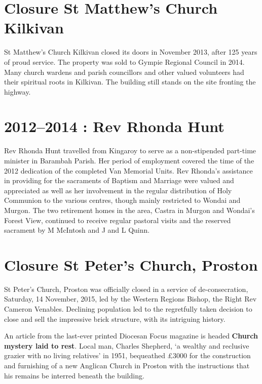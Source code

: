 \section{Closure St Matthew's Church Kilkivan}



St Matthew's Church Kilkivan closed its doors in November 2013, after 125 years of proud service. The property was sold to Gympie Regional Council in 2014. Many church wardens and parish councillors and other valued volunteers had their spiritual roots in Kilkivan. The building still stands on the site fronting the highway.



\section{2012--2014 : Rev Rhonda Hunt}



Rev Rhonda Hunt travelled from Kingaroy to serve as a non-stipended part-time minister in Barambah Parish. Her period of employment covered the time of the 2012 dedication of the completed Van Memorial Units. Rev Rhonda's assistance in providing for the sacraments of Baptism and Marriage were valued and appreciated as well as her involvement in the regular distribution of Holy Communion to the various centres, though mainly restricted to Wondai and Murgon. The two retirement homes in the area, Castra in Murgon and Wondai's Forest View, continued to receive regular pastoral visits and the reserved sacrament by M McIntosh and J and L Quinn.



\section{Closure St Peter's Church, Proston}



St Peter's Church, Proston was officially closed in a service of de-consecration, Saturday, 14 November, 2015, led by the Western Regions Bishop, the Right Rev Cameron Venables. Declining population led to the regretfully taken decision to close and sell the impressive brick structure, with its intriguing history.



An article from the last-ever printed Diocesan Focus magazine is headed \textbf{Church mystery laid to rest}. Local man, Charles Shepherd, `a wealthy and reclusive grazier with no living relatives' in 1951, bequeathed \pounds3000 for the construction and furnishing of a new Anglican Church in Proston with the instructions that his remains be interred beneath the building.



